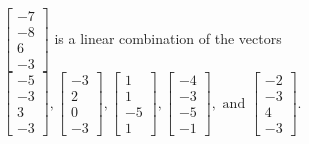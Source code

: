 \begin{exercise}
\begin{exerciseStatement}
  \end{exerciseStatement}
  \begin{exerciseAnswer}
   \(\left[\begin{array}{c}
-7 \\
-8 \\
6 \\
-3
\end{array}\right]\) 
  	 is  
	a linear combination of the vectors \(\left[\begin{array}{c}
-5 \\
-3 \\
3 \\
-3
\end{array}\right] , \left[\begin{array}{c}
-3 \\
2 \\
0 \\
-3
\end{array}\right] , \left[\begin{array}{c}
1 \\
1 \\
-5 \\
1
\end{array}\right] , \left[\begin{array}{c}
-4 \\
-3 \\
-5 \\
-1
\end{array}\right] , \text{ and } \left[\begin{array}{c}
-2 \\
-3 \\
4 \\
-3
\end{array}\right]\).

	
  


  \end{exerciseAnswer}
\end{exercise}